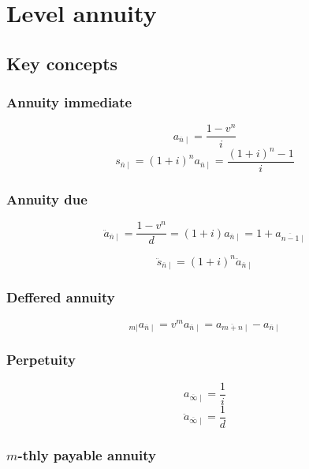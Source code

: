 \documentclass[
]{book}
\begin{document}
\hypertarget{level-annuity}{%
\chapter{Level annuity}\label{level-annuity}}

\hypertarget{key-concepts}{%
\section{Key concepts}\label{key-concepts}}

\hypertarget{annuity-immediate}{%
\subsection*{Annuity immediate}\label{annuity-immediate}}

\[a_{\overline{n}\mid}=\frac{1-v^n}{i}\]
\[s_{\overline{n}\mid}=(1+i)^na_{\overline{n}\mid}=\frac{(1+i)^n-1}{i}\]

\hypertarget{annuity-due}{%
\subsection*{Annuity due}\label{annuity-due}}

\[\ddot{a}_{\overline{n}\mid}=\frac{1-v^n}{d}=(1+i)a_{\overline{n}\mid}=1+a_{\overline{n-1}\mid}\]

\[\ddot{s}_{\overline{n}\mid}=(1+i)^n\ddot{a}_{\overline{n}\mid}\]

\hypertarget{deffered-annuity}{%
\subsection*{Deffered annuity}\label{deffered-annuity}}

\[_{m|}a_{\overline{n}\mid}=v^ma_{\overline{n}\mid}=a_{\overline{m+n}\mid}-a_{\overline{n}\mid}\]

\hypertarget{perpetuity}{%
\subsection*{Perpetuity}\label{perpetuity}}

\[a_{\overline{\infty}\mid}=\frac{1}{i}\]
\[\ddot{a}_{\overline{\infty}\mid}=\frac{1}{d}\]

\hypertarget{m-thly-payable-annuity}{%
\subsection*{\texorpdfstring{\(m\)-thly payable annuity}{m-thly payable annuity}}\label{m-thly-payable-annuity}}
\end{document}

